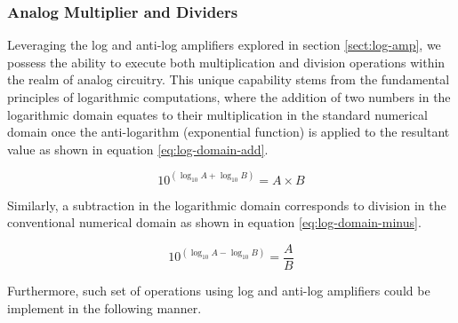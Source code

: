 \documentclass[10pt]{article}
\begin{document}
\begin{multicols*}{2}
                \subsubsection{Analog Multiplier and Dividers} \label{sec:analog-mul-and-div}
                    Leveraging the log and anti-log amplifiers explored in section \ref{sect:log-amp}, we possess the ability to execute both multiplication and division operations within the realm of analog circuitry. This unique capability stems from the fundamental principles of logarithmic computations, where the addition of two numbers in the logarithmic domain equates to their multiplication in the standard numerical domain once the anti-logarithm (exponential function) is applied to the resultant value as shown in equation \ref{eq:log-domain-add}.
                    
                        \begin{equation} \label{eq:log-domain-add}
                            10^{(\log_{10}A+\log_{10}B)}=A\times B
                        \end{equation}
                    
                    \noindent Similarly, a subtraction in the logarithmic domain corresponds to division in the conventional numerical domain as shown in equation \ref{eq:log-domain-minus}.

                        \begin{equation} \label{eq:log-domain-minus}
                            10^{(\log_{10}A-\log_{10}B)}=\frac{A}{B}
                        \end{equation}

                    \noindent Furthermore, such set of operations using log and anti-log amplifiers could be implement in the following manner.
                    
                    \vspace{2ex}

                        \noindent
                        \begin{minipage}{\linewidth}

                            \centering

\end{minipage}
\end{multicols*}
\end{document}
